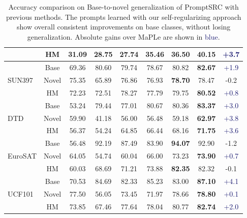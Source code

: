 \begin{table}[t!]
{\begin{tabular}{lc|c c c c c c c}
                               & HM         & 31.09 & 28.75    & 27.74  & 35.46    & 36.50   & \textbf{40.15}  &  \textcolor{MidnightBlue}{{+3.7}}\\
\midrule
\multirow{3}{*}{SUN397}        & Base    & 69.36 & 80.60    &  79.74  &78.67       & 80.82    &\textbf{82.67 } &   \textcolor{MidnightBlue}{{+1.9}}\\
                               & Novel      & 75.35 & 65.89    &  76.86 &76.93    & \textbf{78.70 }        & {78.47}  &  \textcolor{Bittersweet}{{-0.2}}\\
                               & HM        & 72.23 & 72.51    &  78.27 &77.79   & 79.75    & \textbf{80.52}  &  \textcolor{MidnightBlue}{{+0.8}}\\
\midrule
\multirow{3}{*}{DTD}           & Base    & 53.24 & 79.44    & 77.01 &80.67        & 80.36      & \textbf{83.37}  &  \textcolor{MidnightBlue}{{+3.0}}\\
                               & Novel     & 59.90 & 41.18    & 56.00 &56.48      & 59.18       & \textbf{62.97 } &  \textcolor{MidnightBlue}{{+3.8}}\\
                               & HM          & 56.37 & 54.24    & 64.85 &66.44    & 68.16      & \textbf{71.75}  & \textcolor{MidnightBlue}{{+3.6}}\\
\midrule
\multirow{3}{*}{EuroSAT}       & Base    & 56.48 & 92.19    & 87.49  &83.90        & \textbf{94.07}       & {92.90}  &  \textcolor{Bittersweet}{{-1.2}}\\
                               & Novel      & 64.05 & 54.74    & 60.04& 66.00      & 73.23      & \textbf{73.90}  & \textcolor{MidnightBlue}{{+0.7}}\\
                               & HM          & 60.03 & 68.69    & 71.21& 73.88  & \textbf{82.35}   & {82.32}  &  \textcolor{Bittersweet}{{-0.1}}\\
\midrule
\multirow{3}{*}{UCF101}        & Base     & 70.53  & 84.69   & 82.33  &85.23         & 83.00       &\textbf{ 87.10}  & \textcolor{MidnightBlue}{{+4.1}}\\
                               & Novel      & 77.50  & 56.05   & 73.45  &71.97     &78.66         & \textbf{78.80}  &  \textcolor{MidnightBlue}{{+0.1}}\\
                               & HM          & 73.85  & 67.46   & 77.64 &78.04   & 80.77    & \textbf{82.74}  & \textcolor{MidnightBlue}{{+2.0}}\\
\bottomrule
\end{tabular}%
}\vspace{-0.5em}
    \caption{\small\textnormal{Accuracy comparison on Base-to-novel generalization of PromptSRC with previous methods}. The prompts learned with our self-regularizing approach show overall consistent improvements on base classes, without losing generalization. Absolute gains over MaPLe \cite{khattak2023maple} are shown
    in \textcolor{MidnightBlue}{blue}.}
    \label{tab:base-to-new}
\end{table}